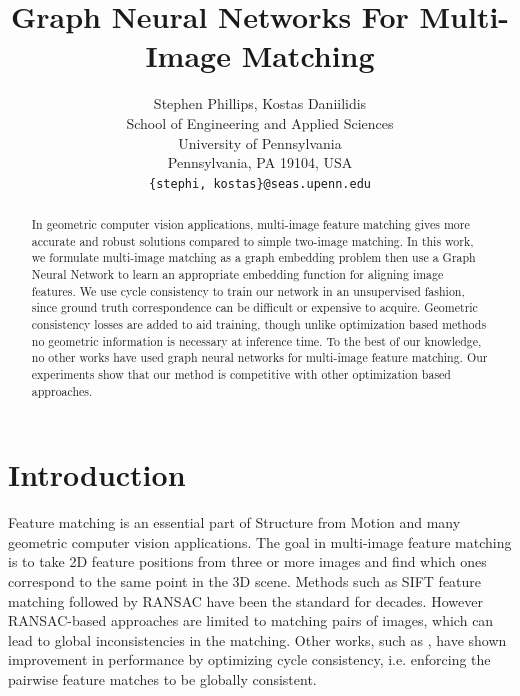 \documentclass{article} %
\title{Graph Neural Networks For Multi-Image Matching}
\author{Stephen Phillips, Kostas Daniilidis \\
School of Engineering and Applied Sciences \\
University of Pennsylvania \\
Pennsylvania, PA 19104, USA \\
\texttt{\{stephi, kostas\}@seas.upenn.edu} \\
}
\begin{document}
\maketitle

\begin{abstract}
    In geometric computer vision applications, multi-image feature matching gives more accurate and robust solutions compared to simple two-image matching.
    In this work, we formulate multi-image matching as a graph embedding problem then use a Graph Neural Network to learn an appropriate embedding function for aligning image features.
    We use cycle consistency to train our network in an unsupervised fashion, since ground truth correspondence can be difficult or expensive to acquire.
    Geometric consistency losses are added to aid training, though unlike optimization based methods no geometric information is necessary at inference time.
    To the best of our knowledge, no other works have used graph neural networks for multi-image feature matching.
    Our experiments show that our method is competitive with other optimization based approaches.
\end{abstract}

\section{Introduction}

Feature matching is an essential part of Structure from Motion and many geometric computer vision applications.
The goal in multi-image feature matching is to take 2D feature positions from three or more images and find which ones correspond to the same point in the 3D scene.
Methods such as SIFT feature matching \citep{lowe2004distinctive} followed by RANSAC \citep{fischler1981random} have been the standard for decades.
However RANSAC-based approaches are limited to matching pairs of images, which can lead to global inconsistencies in the matching.
Other works, such as \cite{wang2017multi}, have shown improvement in performance by optimizing cycle consistency, i.e. enforcing the pairwise feature matches to be globally consistent.
\end{document}
